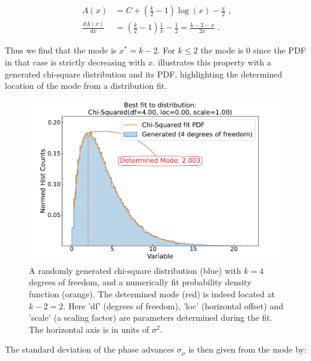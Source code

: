 \begin{equation}
	\begin{aligned}
        A(x)              &= C + \left( \frac{k}{2} - 1 \right) \log(x) - \frac{x}{2} \text{ ,} \\
        \frac{d A(x)}{dx} &= \left( \frac{k}{2} - 1 \right) \frac{1}{x} - \frac{1}{2} = \frac{k - 2 - x}{2x} \text{ .}
	\end{aligned}	
    \label{equation:chi2_pdf_mode_proof}
\end{equation}

Thus we find that the mode is \(x^{*} = k - 2\).
For \(k \leq 2\) the mode is 0 since the PDF in that case is strictly decreasing with \(x\).
 illustrates this property with a generated chi-square distribution and its PDF, highlighting the determined location of the mode from a distribution fit.
\newline

\begin{figure}[!htb]
    \centering
    \includegraphics*[width=\textwidth]{Figures/Other_Studies/phase_chisquare_demo_fit.pdf}
    \caption{A randomly generated chi-square distribution (\textcolor{mplblue}{blue}) with \(k = 4\) degrees of freedom, and a numerically fit probability density function (\textcolor{mplorange}{orange}). The determined mode (\textcolor{mplred}{red}) is indeed located at \(k - 2 = 2\). Here 'df' (degrees of freedom), 'loc' (horizontal offset) and 'scale' (a scaling factor) are parameters determined during the fit. The horizontal axis is in units of \(\sigma^2\).}
    \label{figure:chisquare_demo_fit}
\end{figure}

The standard deviation of the phase advances \(\sigma_{\mu}\) is then given from the mode by:

